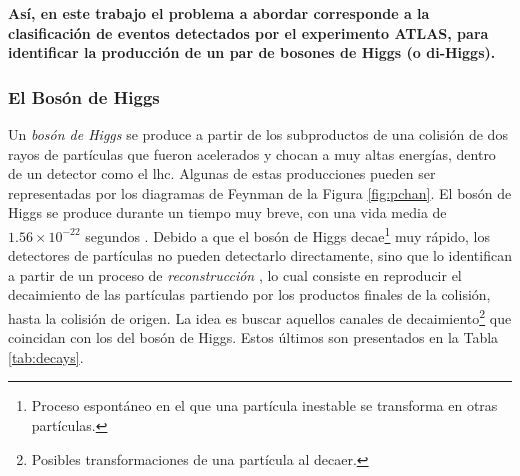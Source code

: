 %
\textbf{Así, en este trabajo el problema a abordar corresponde a la clasificación de eventos detectados por el experimento ATLAS, para identificar la producción de un par de bosones de Higgs (o di-Higgs).}

\subsubsection{El Bosón de Higgs}

Un \textit{bosón de Higgs} se produce a partir de los subproductos de una colisión de dos rayos de partículas que fueron acelerados y chocan a muy altas energías, dentro de un detector como el \acrshort{lhc}.
%
Algunas de estas producciones pueden ser representadas por los diagramas de Feynman de la Figura \ref{fig:pchan}. 
%
El bosón de Higgs se produce durante un tiempo muy breve, con una vida media de $1.56 \times 10^{-22}$ segundos \cite{Mellado2012}. 
%
Debido a que el bosón de Higgs decae\footnote{Proceso espontáneo en el que una partícula inestable se transforma en otras partículas.} muy rápido, los detectores de partículas no pueden detectarlo directamente, sino que lo identifican a partir de un proceso de \textit{reconstrucción} \cite{Giardino2012}, lo cual consiste en reproducir el decaimiento de las partículas partiendo por los productos finales de la colisión, hasta la colisión de origen. 
%
La idea es buscar aquellos canales de decaimiento\footnote{Posibles transformaciones de una partícula al decaer.} que coincidan con los del bosón de Higgs. 
%
Estos últimos son presentados en la Tabla \ref{tab:decays}.

